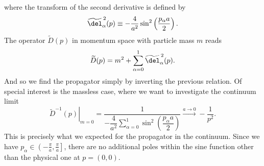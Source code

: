  where the  transform of the second derivative is defined by
 \begin{equation}
 {\widetilde{\del}_\alpha}^{\,2}(p) \equiv -\dfrac{4}{a^2}\sin^{2}\left(\dfrac{p_{\alpha}a}{2}\right).
 \label{momentum laplace}
 \end{equation}
 The   operator $\widetilde{D}(p)$ in momentum space with particle mass $m$ reads
 \begin{equation}
 \widetilde{D}(p) = m^2 + \sum\limits_{\alpha=0}^{1} {\widetilde{\del}_\alpha}^{\,2}(p) .
 \end{equation}
And so we find the propagator simply by inverting the previous relation. Of special interest is the massless case, where we want to investigate the continuum limit
\begin{equation}
\left.\widetilde{D}^{-1}(p)\right\vert_{m=0}=\dfrac{1}{-\dfrac{4}{a^2} \sum\limits_{\alpha=0}^{1} \sin^{2}\left(\dfrac{p_{\alpha}a}{2}\right) } \xrightarrow{a \rightarrow 0} -\dfrac{1}{p^2}.
\end{equation}
This is precisely what we expected for the  propagator in the continuum. Since we have $p_{\alpha}\in \left(-\tfrac{\pi}{a},\tfrac{\pi}{a}\right]$, there are no additional poles within the sine function other than the physical one at $p=(0,0)$.
%
%
%
%
%
